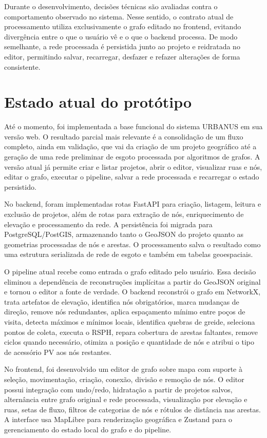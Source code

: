 \documentclass[12pt,a4paper]{article}
\begin{document}
Durante o desenvolvimento, decisões técnicas são avaliadas contra o comportamento observado no sistema.
Nesse sentido, o contrato atual de processamento utiliza exclusivamente o grafo editado no frontend, evitando divergência entre o que o usuário vê e o que o backend processa.
De modo semelhante, a rede processada é persistida junto ao projeto e reidratada no editor, permitindo salvar, recarregar, desfazer e refazer alterações de forma consistente.

\section{Estado atual do protótipo}

Até o momento, foi implementada a base funcional do sistema URBANUS em sua versão web.
O resultado parcial mais relevante é a consolidação de um fluxo completo, ainda em validação, que vai da criação de um projeto geográfico até a geração de uma rede preliminar de esgoto processada por algoritmos de grafos.
A versão atual já permite criar e listar projetos, abrir o editor, visualizar ruas e nós, editar o grafo, executar o pipeline, salvar a rede processada e recarregar o estado persistido.

No backend, foram implementadas rotas FastAPI para criação, listagem, leitura e exclusão de projetos, além de rotas para extração de nós, enriquecimento de elevação e processamento da rede. A persistência foi migrada para PostgreSQL/PostGIS, armazenando tanto o GeoJSON do projeto quanto as geometrias processadas de nós e arestas. O processamento salva o resultado como uma estrutura serializada de rede de esgoto e também em tabelas geoespaciais.

O pipeline atual recebe como entrada o grafo editado pelo usuário. Essa decisão eliminou a dependência de reconstruções implícitas a partir do GeoJSON original e tornou o editor a fonte de verdade.
O backend reconstrói o grafo em NetworkX, trata artefatos de elevação, identifica nós obrigatórios, marca mudanças de direção, remove nós redundantes, aplica espaçamento mínimo entre poços de visita, detecta máximos e mínimos locais, identifica quebras de greide, seleciona pontos de coleta, executa o RSPH, repara cobertura de arestas faltantes, remove ciclos quando necessário, otimiza a posição e quantidade de nós e atribui o tipo de acessório PV aos nós restantes.

No frontend, foi desenvolvido um editor de grafo sobre mapa com suporte à seleção, movimentação, criação, conexão, divisão e remoção de nós. O editor possui integração com undo/redo, hidratação a partir de projetos salvos, alternância entre grafo original e rede processada, visualização por elevação e ruas, setas de fluxo, filtros de categorias de nós e rótulos de distância nas arestas. A interface usa MapLibre para renderização geográfica e Zustand para o gerenciamento do estado local do grafo e do pipeline.
\end{document}
